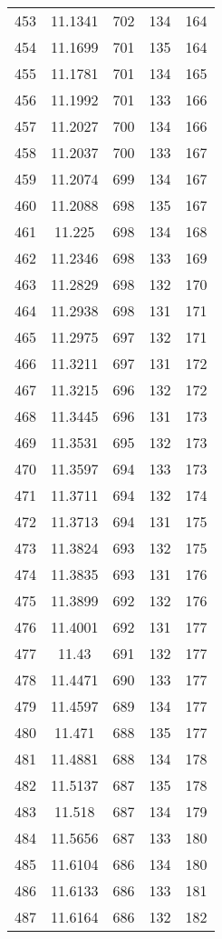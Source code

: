 \documentclass[12pt,a4paper]{article}
\begin{document}
\begin{tabular}{r|cccc}
	453 & 11.1341 & 702 & 134 & 164 \\
	454 & 11.1699 & 701 & 135 & 164 \\
	455 & 11.1781 & 701 & 134 & 165 \\
	456 & 11.1992 & 701 & 133 & 166 \\
	457 & 11.2027 & 700 & 134 & 166 \\
	458 & 11.2037 & 700 & 133 & 167 \\
	459 & 11.2074 & 699 & 134 & 167 \\
	460 & 11.2088 & 698 & 135 & 167 \\
	461 & 11.225 & 698 & 134 & 168 \\
	462 & 11.2346 & 698 & 133 & 169 \\
	463 & 11.2829 & 698 & 132 & 170 \\
	464 & 11.2938 & 698 & 131 & 171 \\
	465 & 11.2975 & 697 & 132 & 171 \\
	466 & 11.3211 & 697 & 131 & 172 \\
	467 & 11.3215 & 696 & 132 & 172 \\
	468 & 11.3445 & 696 & 131 & 173 \\
	469 & 11.3531 & 695 & 132 & 173 \\
	470 & 11.3597 & 694 & 133 & 173 \\
	471 & 11.3711 & 694 & 132 & 174 \\
	472 & 11.3713 & 694 & 131 & 175 \\
	473 & 11.3824 & 693 & 132 & 175 \\
	474 & 11.3835 & 693 & 131 & 176 \\
	475 & 11.3899 & 692 & 132 & 176 \\
	476 & 11.4001 & 692 & 131 & 177 \\
	477 & 11.43 & 691 & 132 & 177 \\
	478 & 11.4471 & 690 & 133 & 177 \\
	479 & 11.4597 & 689 & 134 & 177 \\
	480 & 11.471 & 688 & 135 & 177 \\
	481 & 11.4881 & 688 & 134 & 178 \\
	482 & 11.5137 & 687 & 135 & 178 \\
	483 & 11.518 & 687 & 134 & 179 \\
	484 & 11.5656 & 687 & 133 & 180 \\
	485 & 11.6104 & 686 & 134 & 180 \\
	486 & 11.6133 & 686 & 133 & 181 \\
	487 & 11.6164 & 686 & 132 & 182 \\

\end{tabular}
\end{document}
